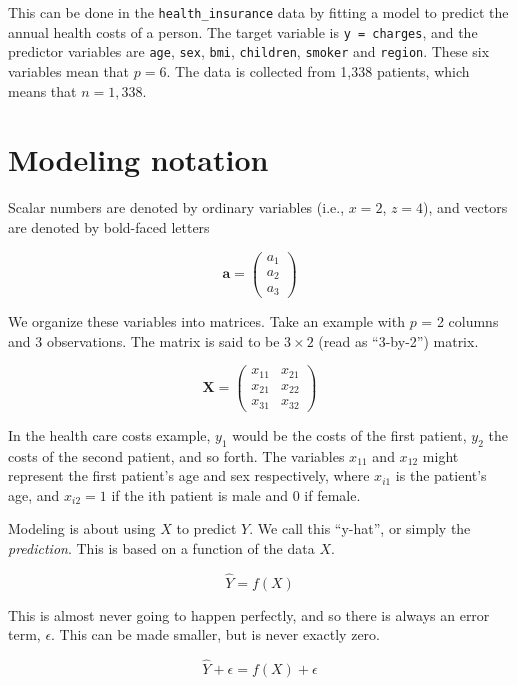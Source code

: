 \documentclass[openany]{book}
\begin{document}
This can be done in the \texttt{health\_insurance} data by fitting a model to predict the annual health costs of a person. The target variable is \texttt{y\ =\ charges}, and the predictor variables are \texttt{age}, \texttt{sex}, \texttt{bmi}, \texttt{children}, \texttt{smoker} and \texttt{region}. These six variables mean that \(p = 6\). The data is collected from 1,338 patients, which means that \(n = 1,338\).

\hypertarget{modeling-notation}{%
\section{Modeling notation}\label{modeling-notation}}

Scalar numbers are denoted by ordinary variables (i.e., \(x = 2\), \(z = 4\)), and vectors are denoted by bold-faced letters

\[\mathbf{a} = \begin{pmatrix} a_1 \\ a_2 \\ a_3 \end{pmatrix}\]

We organize these variables into matrices. Take an example with \(p\) = 2 columns and 3 observations. The matrix is said to be \(3 \times 2\) (read as ``3-by-2'') matrix.

\[
\mathbf{X} = \begin{pmatrix}x_{11} & x_{21}\\
x_{21} & x_{22}\\
x_{31} & x_{32}
\end{pmatrix}
\]

In the health care costs example, \(y_1\) would be the costs of the first patient, \(y_2\) the costs of the second patient, and so forth. The variables \(x_{11}\) and \(x_{12}\) might represent the first patient's age and sex respectively, where \(x_{i1}\) is the patient's age, and \(x_{i2} = 1\) if the ith patient is male and 0 if female.

Modeling is about using \(X\) to predict \(Y\). We call this ``y-hat'', or simply the \emph{prediction}. This is based on a function of the data \(X\).

\[\hat{Y} = f(X)\]

This is almost never going to happen perfectly, and so there is always an error term, \(\epsilon\). This can be made smaller, but is never exactly zero.

\[
\hat{Y} + \epsilon = f(X) + \epsilon
\]
\end{document}
